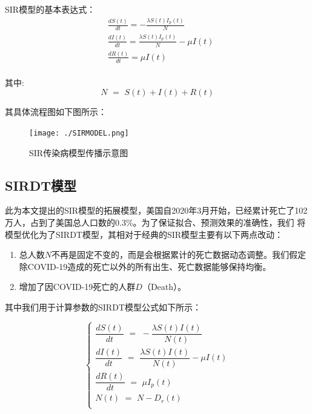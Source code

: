 \documentclass[bwprint]{gmcmthesis}
\numberwithin{figure}{section}
\begin{document}
SIR模型的基本表达式：
\begin{equation} \label{}
\begin{aligned}
        &\frac{dS\left( t \right)}{dt}=-\frac{\lambda S\left( t \right) I_p\left( t \right)}{N}\\
        &\frac{dI\left( t \right)}{dt}=\frac{\lambda S\left( t \right) I_p\left( t \right)}{N}-\mu I\left( t \right)\\
        &\frac{dR\left( t \right)}{dt}=\mu I\left( t \right)\\
\end{aligned}
\end{equation}

\par 其中:
\begin{equation} \label{}
    N\,\,=\,\,S\left( t \right) +I\left( t \right) +R\left( t \right) 
\end{equation}

\par 其具体流程图如下图所示：
\begin{figure}[!h]
\centering
\texttt{[image: ./SIRMODEL.png]}
\caption{SIR传染病模型传播示意图}
\label{fig1}
\end{figure}

\subsection{SIRDT模型}
\par 此为本文提出的SIR模型的拓展模型，美国自2020年3月开始，已经累计死亡了102万人，占到了美国总人口数的0.3$\%$。为了保证拟合、预测效果的准确性，我们
将模型优化为了SIRDT模型，其相对于经典的SIR模型主要有以下两点改动：

\begin{enumerate}
    \item 总人数$N$不再是固定不变的，而是会根据累计的死亡数据动态调整。我们假定除COVID-19造成的死亡以外的所有出生、死亡数据能够保持均衡。
    \item 增加了因COVID-19死亡的人群$D$（Death）。
\end{enumerate}

\par 其中我们用于计算参数的SIRDT模型公式如下所示：

\begin{equation} \label{}
    \begin{cases}
        \dfrac{dS\left( t \right)}{dt}\,\,=\,\,-\dfrac{\lambda S\left( t \right) I\left( t \right)}{N\left( t \right)}\\
        \dfrac{dI\left( t \right)}{dt}\,\,=\,\,\dfrac{\lambda S\left( t \right) I\left( t \right)}{N\left( t \right)}-\mu I\left( t \right)\\
        \dfrac{dR\left( t \right)}{dt}\,\,=\,\,\mu I_p\left( t \right)\\
        N\left( t \right) \,\,=\,\,N-D_r\left( t \right)\\
    \end{cases}
\end{equation}
\end{document}
